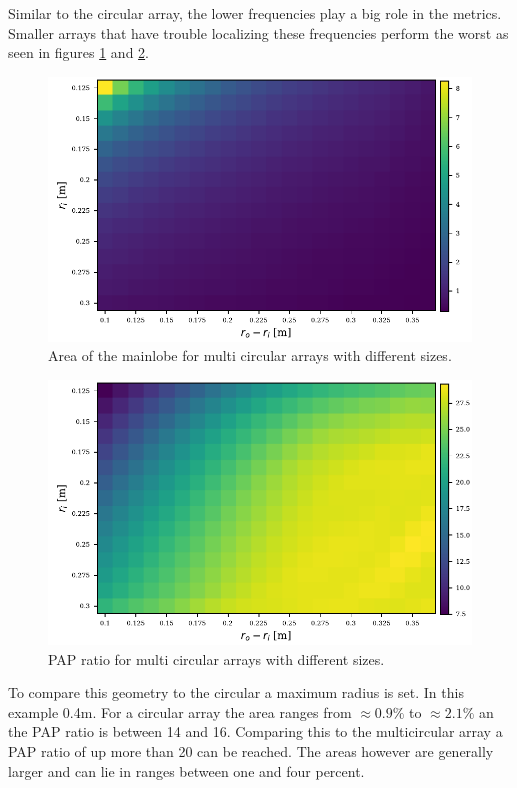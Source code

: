 Similar to the circular array, the lower frequencies play a big role in the metrics.
Smaller arrays that have trouble localizing these frequencies perform the worst as seen
in figures \ref*{aev:fig:FancyArea} and \ref*{aev:fig:FancyPap}.

\begin{figure}[h]
	\centering
	\includegraphics[]{images/5_array_evaluation/fancy_area.pdf}
	\caption{Area of the mainlobe for multi circular arrays with different
	sizes.}
	\label{aev:fig:FancyArea}
\end{figure}

\begin{figure}[h]
	\centering
	\includegraphics[]{images/5_array_evaluation/fancy_pap.pdf}
	\caption{PAP ratio for multi circular arrays with different
	sizes.}
	\label{aev:fig:FancyPap}
\end{figure}

To compare this geometry to the circular a maximum radius is set.
In this example 0.4m. 
For a circular array the area ranges from $\approx 0.9\%$ to 
$\approx 2.1\%$ an the PAP ratio is between 14 and 16.
Comparing this to the multicircular array a PAP ratio of up
more than 20 can be reached. 
The areas however are generally larger and can lie in ranges 
between one and four percent.

